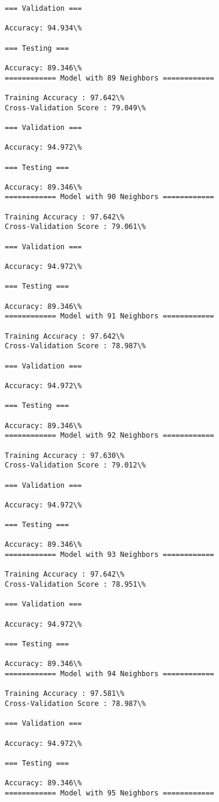 \documentclass[11pt]{article}
\begin{document}
\begin{Verbatim}[commandchars=\\\{\}]
=== Validation ===

Accuracy: 94.934\%

=== Testing ===

Accuracy: 89.346\%
============ Model with 89 Neighbors ============

Training Accuracy : 97.642\%
Cross-Validation Score : 79.049\%

=== Validation ===

Accuracy: 94.972\%

=== Testing ===

Accuracy: 89.346\%
============ Model with 90 Neighbors ============

Training Accuracy : 97.642\%
Cross-Validation Score : 79.061\%

=== Validation ===

Accuracy: 94.972\%

=== Testing ===

Accuracy: 89.346\%
============ Model with 91 Neighbors ============

Training Accuracy : 97.642\%
Cross-Validation Score : 78.987\%

=== Validation ===

Accuracy: 94.972\%

=== Testing ===

Accuracy: 89.346\%
============ Model with 92 Neighbors ============

Training Accuracy : 97.630\%
Cross-Validation Score : 79.012\%

=== Validation ===

Accuracy: 94.972\%

=== Testing ===

Accuracy: 89.346\%
============ Model with 93 Neighbors ============

Training Accuracy : 97.642\%
Cross-Validation Score : 78.951\%

=== Validation ===

Accuracy: 94.972\%

=== Testing ===

Accuracy: 89.346\%
============ Model with 94 Neighbors ============

Training Accuracy : 97.581\%
Cross-Validation Score : 78.987\%

=== Validation ===

Accuracy: 94.972\%

=== Testing ===

Accuracy: 89.346\%
============ Model with 95 Neighbors ============


\end{Verbatim}
\end{document}
